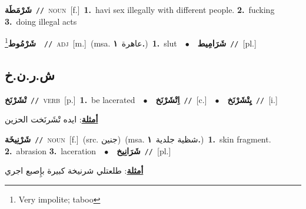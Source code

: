 \documentclass[10pt,a4paper,twoside]{article} %
\begin{document}
\begin{multicols}{2}
{\setlength\topsep{0pt}\textbf{\foreignlanguage{arabic}{شَرْمَطَة}}\ {\color{gray}\texttt{//}\color{black}}\ \textsc{noun}\ [f.]\ \textbf{1.}~havi sex illegally with different people.  \textbf{2.}~fucking  \textbf{3.}~doing illegal acts\ } \vspace{2mm}

{\setlength\topsep{0pt}\textbf{\foreignlanguage{arabic}{شَرْمُوط}}\footnote{Very impolite; taboo}\ \ {\color{gray}\texttt{//}\color{black}}\ \textsc{adj}\ [m.]\ \color{gray}(msa. \foreignlanguage{arabic}{عاهرة}~\foreignlanguage{arabic}{\textbf{١.}})\color{black}\ \textbf{1.}~slut\ \ $\bullet$\ \ \setlength\topsep{0pt}\textbf{\foreignlanguage{arabic}{شَرَامِيط}}\ {\color{gray}\texttt{//}\color{black}}\ [pl.]\ } \vspace{2mm}

\vspace{-3mm}
\subsection*{\color{blue}\foreignlanguage{arabic}{ش.ر.ن.خ}\color{blue}{}} 

{\setlength\topsep{0pt}\textbf{\foreignlanguage{arabic}{تْشَرْنَخ}}\ {\color{gray}\texttt{//}\color{black}}\ \textsc{verb}\ [p.]\ \textbf{1.}~be lacerated\ \ $\bullet$\ \ \setlength\topsep{0pt}\textbf{\foreignlanguage{arabic}{اِتْشَرْنَخ}}\ {\color{gray}\texttt{//}\color{black}}\ [c.]\ \ $\bullet$\ \ \setlength\topsep{0pt}\textbf{\foreignlanguage{arabic}{يِتْشَرْنَخ}}\ {\color{gray}\texttt{//}\color{black}}\ [i.]\  \begin{flushright}\color{gray}\foreignlanguage{arabic}{\textbf{\underline{\foreignlanguage{arabic}{أمثلة}}}: ايده تْشَرنَخت الحزين}\end{flushright}\color{black}} \vspace{2mm}

{\setlength\topsep{0pt}\textbf{\foreignlanguage{arabic}{شَرْنِيخَة}}\ {\color{gray}\texttt{//}\color{black}}\ \textsc{noun}\ [f.]\ (src. \color{gray}\foreignlanguage{arabic}{جنين}\color{black})\ \color{gray}(msa. \foreignlanguage{arabic}{شظية جلدية}~\foreignlanguage{arabic}{\textbf{١.}})\color{black}\ \textbf{1.}~skin fragment.  \textbf{2.}~abrasion  \textbf{3.}~laceration\ \ $\bullet$\ \ \setlength\topsep{0pt}\textbf{\foreignlanguage{arabic}{شَرَانِيخ}}\ {\color{gray}\texttt{//}\color{black}}\ [pl.]\  \begin{flushright}\color{gray}\foreignlanguage{arabic}{\textbf{\underline{\foreignlanguage{arabic}{أمثلة}}}: طلعتلي شرنيخة كبيرة بإِصبع اجري}\end{flushright}\color{black}} \vspace{2mm}


\end{multicols}
\end{document}
